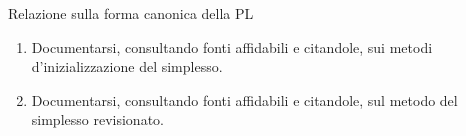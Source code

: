 \documentclass{beamer}
\begin{document}
\generatitolo


\begin{frame}{Relazione sulla forma canonica della PL}

    \begin{enumerate}
    
     \item Documentarsi, consultando fonti affidabili e citandole,
     sui metodi d'inizializzazione del simplesso.
     
     \item Documentarsi, consultando fonti affidabili e citandole,
     sul metodo del simplesso revisionato. 
    \end{enumerate}
\end{frame}
\end{document}
